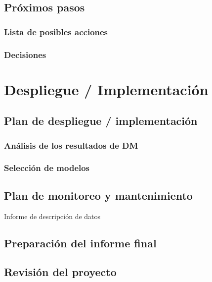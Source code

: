 \documentclass[11pt,a4paper,twoside]{tesis}
\begin{document}
\section{Próximos pasos}

\subsection{Lista de posibles acciones}
\subsection{Decisiones}


\chapter{Despliegue / Implementación}
\section{Plan de despliegue / implementación}
\subsection{Análisis de los resultados de DM}
\subsection{Selección de modelos}
\section{Plan de monitoreo y mantenimiento}
Informe de descripción de datos
\section{Preparación del informe final}
\section{Revisión del proyecto}



\backmatter


\end{document}
